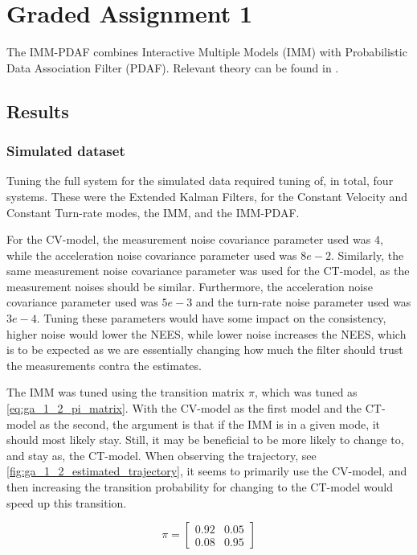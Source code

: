 \section{Graded Assignment 1}\label{sec:graded_assignment_1}
The IMM-PDAF combines Interactive Multiple Models (IMM) with Probabilistic Data Association Filter (PDAF). Relevant theory can be found in \cite[p. 100-101, 120 - 122]{Edmund}. 

\subsection*{Results}
\subsubsection*{Simulated dataset}
Tuning the full system for the simulated data required tuning of, in total, four systems. These were the Extended Kalman Filters, for the Constant Velocity and Constant Turn-rate modes, the IMM, and the IMM-PDAF. 

For the CV-model, the measurement noise covariance parameter used was $4$, while the acceleration noise covariance parameter used was $8e-2$. Similarly, the same measurement noise covariance parameter was used for the CT-model, as the measurement noises should be similar. Furthermore, the acceleration noise covariance parameter used was $5e-3$ and the turn-rate noise parameter used was $3e-4$. Tuning these parameters would have some impact on the consistency, higher noise would lower the NEES, while lower noise increases the NEES, which is to be expected as we are essentially changing how much the filter should trust the measurements contra the estimates. 

The IMM was tuned using the transition matrix $\pi$, which was tuned as \cref{eq:ga_1_2_pi_matrix}. With the CV-model as the first model and the CT-model as the second, the argument is that if the IMM is in a given mode, it should most likely stay. Still, it may be beneficial to be more likely to change to, and stay as, the CT-model. When observing the trajectory, see \cref{fig:ga_1_2_estimated_trajectory}, it seems to primarily use the CV-model, and then increasing the transition probability for changing to the CT-model would speed up this transition. 

\begin{equation}
    \label{eq:ga_1_2_pi_matrix}
    \pi = \begin{bmatrix}
        0.92 & 0.05 \\
        0.08 & 0.95
    \end{bmatrix}
\end{equation}

